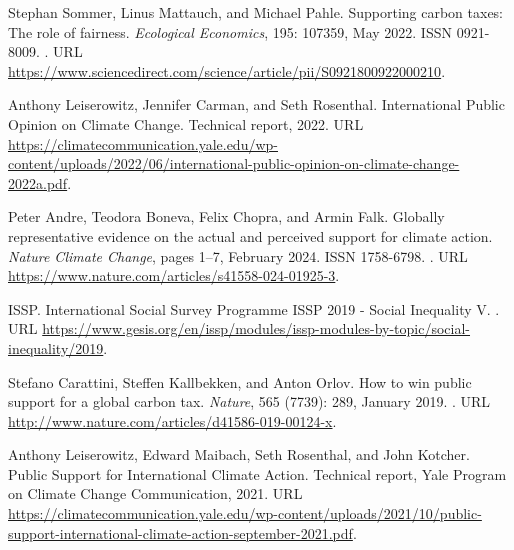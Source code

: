 \begin{thebibliography}{55}
  Stephan Sommer, Linus Mattauch, and Michael Pahle.
  \newblock Supporting carbon taxes: {{The}} role of fairness.
  \newblock \emph{Ecological Economics}, 195: 107359, May 2022.
  \newblock ISSN 0921-8009.
  \newblock {}.
  \newblock URL
    \url{https://www.sciencedirect.com/science/article/pii/S0921800922000210}.
  
  Anthony Leiserowitz, Jennifer Carman, and Seth Rosenthal.
  \newblock International {{Public Opinion}} on {{Climate Change}}.
  \newblock Technical report, 2022.
  \newblock URL
    \url{https://climatecommunication.yale.edu/wp-content/uploads/2022/06/international-public-opinion-on-climate-change-2022a.pdf}.
  
  Peter Andre, Teodora Boneva, Felix Chopra, and Armin Falk.
  \newblock Globally representative evidence on the actual and perceived support
    for climate action.
  \newblock \emph{Nature Climate Change}, pages 1--7, February 2024.
  \newblock ISSN 1758-6798.
  \newblock {}.
  \newblock URL \url{https://www.nature.com/articles/s41558-024-01925-3}.
  
  ISSP.
  \newblock International {{Social Survey Programme ISSP}} 2019 - {{Social
    Inequality V}}.
  .
  \newblock URL
    \url{https://www.gesis.org/en/issp/modules/issp-modules-by-topic/social-inequality/2019}.
  
  Stefano Carattini, Steffen Kallbekken, and Anton Orlov.
  \newblock How to win public support for a global carbon tax.
  \newblock \emph{Nature}, 565 (7739): 289, January 2019.
  \newblock {}.
  \newblock URL \url{http://www.nature.com/articles/d41586-019-00124-x}.
  
  Anthony Leiserowitz, Edward Maibach, Seth Rosenthal, and John Kotcher.
  \newblock Public {{Support}} for {{International Climate Action}}.
  \newblock Technical report, Yale Program on Climate Change Communication, 2021.
  \newblock URL
    \url{https://climatecommunication.yale.edu/wp-content/uploads/2021/10/public-support-international-climate-action-september-2021.pdf}.
  

\end{thebibliography}
